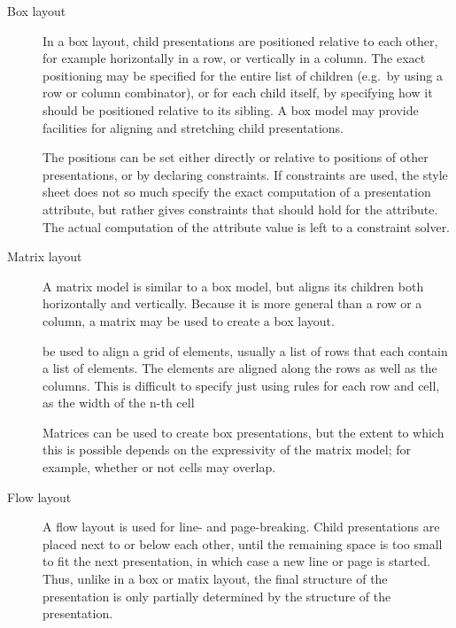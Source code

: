 \begin{description}
\item[Box layout]
In a box layout, child presentations are positioned relative to each other, for example horizontally in a row, or vertically in a column. The exact positioning may be specified for the entire list of children (e.g.\ by using a row or column combinator), or for each child itself, by specifying how it should be positioned relative to its sibling. A box model may provide facilities for aligning and stretching child presentations.

\bc The positions can be set either directly or relative to positions of other presentations, or by declaring constraints. If constraints are used, the style sheet does not so much specify the exact computation of a presentation attribute, but rather gives constraints that should hold for the attribute. The actual computation of the attribute value is left to a constraint solver. \ec
\item[Matrix layout]
A matrix model is similar to a box model, but aligns its children both horizontally and vertically. Because it is more general than a row or a column, a matrix may be used to create a box layout. 

\bc  be used to align a grid of elements, usually a list of rows that each contain a list of elements. The elements are aligned along the rows as well as the columns. This is difficult to specify just using rules for each row and cell, as the width of the n-th cell %

Matrices can be used to create box presentations, but the extent to which this is possible depends on the expressivity of the matrix model; for example, whether or not cells may overlap.
\ec

\item[Flow layout]

A flow layout is used for line- and page-breaking. Child presentations are placed next to or below each other, until the remaining space is too small to fit the next presentation, in which case a new line or page is started. Thus, unlike in a box or matix layout, the final structure of the presentation is only partially determined by the structure of the presentation.

%
\end{description}

